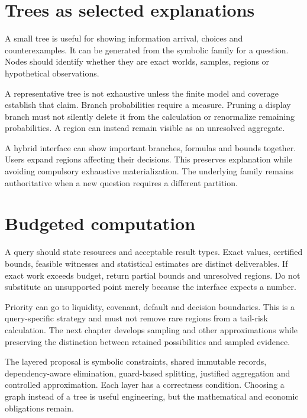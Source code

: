 \section{Trees as selected explanations}
A small tree is useful for showing information arrival, choices and counterexamples. It can be generated from the symbolic family for a question. Nodes should identify whether they are exact worlds, samples, regions or hypothetical observations.

A representative tree is not exhaustive unless the finite model and coverage establish that claim. Branch probabilities require a measure. Pruning a display branch must not silently delete it from the calculation or renormalize remaining probabilities. A region can instead remain visible as an unresolved aggregate.

A hybrid interface can show important branches, formulas and bounds together. Users expand regions affecting their decisions. This preserves explanation while avoiding compulsory exhaustive materialization. The underlying family remains authoritative when a new question requires a different partition.

\section{Budgeted computation}
A query should state resources and acceptable result types. Exact values, certified bounds, feasible witnesses and statistical estimates are distinct deliverables. If exact work exceeds budget, return partial bounds and unresolved regions. Do not substitute an unsupported point merely because the interface expects a number.

Priority can go to liquidity, covenant, default and decision boundaries. This is a query-specific strategy and must not remove rare regions from a tail-risk calculation. The next chapter develops sampling and other approximations while preserving the distinction between retained possibilities and sampled evidence.

The layered proposal is symbolic constraints, shared immutable records, dependency-aware elimination, guard-based splitting, justified aggregation and controlled approximation. Each layer has a correctness condition. Choosing a graph instead of a tree is useful engineering, but the mathematical and economic obligations remain.
